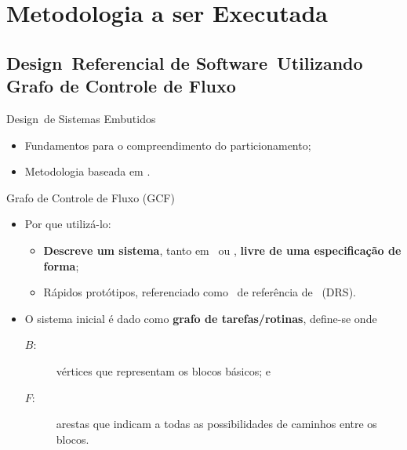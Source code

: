 
\section{Metodologia a ser Executada}
   \subsection{Design\ Referencial de Software\ Utilizando Grafo de Controle de Fluxo}
      \begin{frame}{Design\ de Sistemas Embutidos}
         \begin{itemize}  \setlength{\itemsep}{1.6em}
            \item Fundamentos para o compreendimento do particionamento;
            \item Metodologia baseada em \parencite{Sass2010, Arato2003, Arato2005, Mann2007, Hassine2017}.
         \end{itemize}
      \end{frame}
   
      \begin{frame}{Grafo de Controle de Fluxo (GCF)} \vspace{-1em}
         \begin{itemize}
            \setlength{\itemsep}{1.5em}
            \item Por que utilizá-lo:
            \begin{itemize}
                \setlength{\itemsep}{0.5em}
               \item \textbf{Descreve um sistema}, tanto em \software\ ou \hardware, \textbf{livre de uma especificação de forma};
               \item Rápidos protótipos, referenciado como \design\ de referência de \software\ (DRS).
            \end{itemize}
   
            \item O sistema inicial é dado como \textbf{grafo de tarefas/rotinas}, define-se  onde
            \begin{description}
               \item [$B$:] vértices que representam os blocos básicos; e 
               \item [$F$:] arestas que indicam a todas as possibilidades de caminhos entre os blocos.
            \end{description}
         \end{itemize}
      \end{frame}
   
